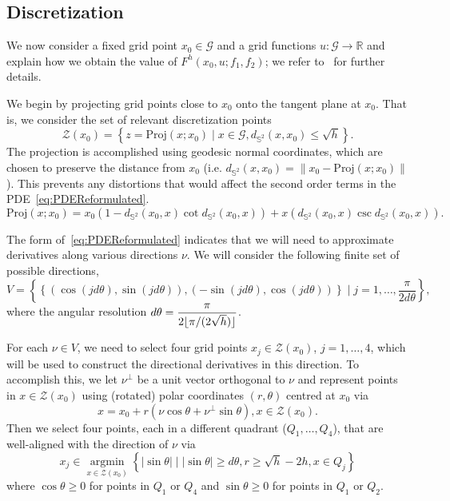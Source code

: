 \documentclass{amsart}
\DeclareMathOperator*{\argmin}{argmin}
\DeclarePairedDelimiter\floor{\lfloor}{\rfloor}
\newcommand{\bq}{\begin{equation}}
\newcommand{\eq}{\end{equation}}
\newcommand{\R}{\mathbb{R}}
\newcommand{\abs}[1]{\left\vert#1\right\vert}
\newcommand{\G}{\mathcal{G}}
\newcommand{\Sf}{\mathbb{S}^{2}}
\newcommand{\Zf}{\mathcal{Z}}
\theoremstyle{lemma}
\theoremstyle{remark}
\begin{document}
\subsection{Discretization}
We now consider a fixed grid point $x_0 \in \G$ and a grid functions $u:\G\to\R$ and explain how we obtain the value of $F^h(x_0,u;f_1,f_2)$; we refer to~\cite{HT_OTonSphere2} for further details.

We begin by projecting grid points close to $x_0$ onto the tangent plane at $x_0$.  That is, we consider the set of relevant discretization points
\bq\label{eq:neighbourCandidates}
\Zf(x_0) = \left\{z = \text{Proj}(x;x_0) \mid x \in \G, d_{\Sf}(x,x_0) \leq \sqrt{h}\right\}.
\eq
The projection is accomplished using geodesic normal coordinates, which are chosen to preserve the distance from $x_0$ (i.e. $d_{\Sf}(x,x_0) = \|x_0 -  \text{Proj}(x;x_0)\|$).  This prevents any distortions that would affect the second order terms in the PDE~\eqref{eq:PDEReformulated}.
\bq\label{eq:projection}
\text{Proj}(x;x_0) = x_0\left(1-d_{\Sf}(x_0,x)\cot d_{\Sf}(x_0,x)\right) + x \left(d_{\Sf}(x_0,x)\csc d_{\Sf}(x_0,x)\right).
\eq

The form of~\eqref{eq:PDEReformulated} indicates that we will need to approximate derivatives along various directions $\nu$.  We will consider the following finite set of possible directions,
\bq\label{eq:directions}
V = \left\{\left\{(\cos(jd\theta),\sin(jd\theta)),(-\sin(jd\theta),\cos(jd\theta))\right\} \mid j=1,\ldots,\frac{\pi}{2d\theta}\right\},
\eq
where the angular resolution $d\theta = \dfrac{\pi}{2\floor{\pi/(2\sqrt{h})}}$.

For each $\nu\in V$, we need to select four grid points $x_j\in\Zf(x_0)$, $j=1, \ldots, 4$, which will be used to construct the directional derivatives in this direction.  To accomplish this, we let $\nu^\perp$ be a unit vector orthogonal to $\nu$ and represent points in $x\in\Zf(x_0)$ using (rotated) polar coordinates $(r,\theta)$ centred at $x_0$ via
\[ x = x_0 + r(\nu\cos\theta + \nu^\perp\sin\theta), x \in \Zf(x_0). \]
Then we select four points, each in a different quadrant ($Q_1, \ldots, Q_4$), that are well-aligned with the direction of $\nu$ via
\bq\label{eq:neighbours}
x_j \in \argmin\limits_{x\in\Zf(x_0)}\left\{\abs{\sin\theta} \mid \abs{\sin\theta} \geq d\theta, r \geq \sqrt{h}-2h, x\in Q_j\right\}
\eq
where $\cos\theta \geq 0$ for points in $Q_1$ or $Q_4$ and $\sin\theta \geq 0$ for points in $Q_1$ or $Q_2$.  
\end{document}
